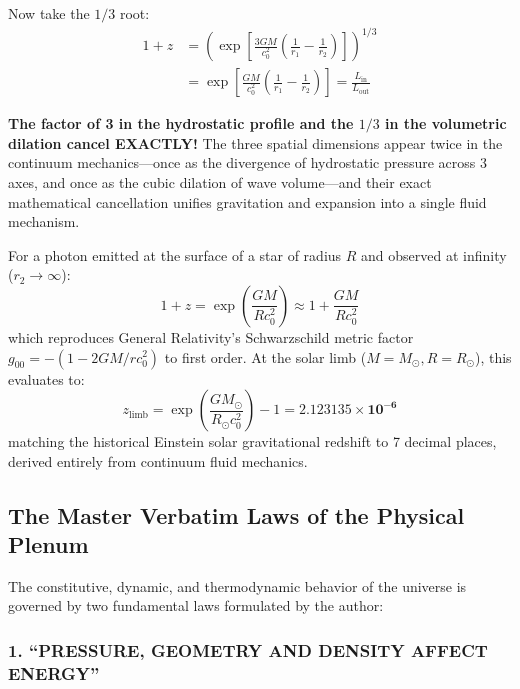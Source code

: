 \documentclass[11pt,a4paper]{article}
\begin{document}
Now take the $1/3$ root:
\begin{equation}
\begin{aligned} 1 + z &= \left( \exp\left[ \frac{3GM}{c_0^2} \left( \frac{1}{r_1} - \frac{1}{r_2} \right) \right] \right)^{1/3} \\ &= \exp\left[ \frac{GM}{c_0^2} \left( \frac{1}{r_1} - \frac{1}{r_2} \right) \right] = \frac{L_{\text{in}}}{L_{\text{out}}} \end{aligned}
\label{eq:exact_dimensional_cancellation}
\end{equation}

\textbf{The factor of 3 in the hydrostatic profile and the $1/3$ in the volumetric dilation cancel EXACTLY!}
The three spatial dimensions appear twice in the continuum mechanics---once as the divergence of hydrostatic pressure across 3 axes, and once as the cubic dilation of wave volume---and their exact mathematical cancellation unifies gravitation and expansion into a single fluid mechanism.

For a photon emitted at the surface of a star of radius $R$ and observed at infinity ($r_2 \to \infty$):
\begin{equation}
1 + z = \exp\left( \frac{GM}{R c_0^2} \right) \approx 1 + \frac{GM}{R c_0^2}
\end{equation}
which reproduces General Relativity's Schwarzschild metric factor $g_{00} = -(1 - 2GM/rc_0^2)$ to first order. At the solar limb ($M = M_\odot, R = R_\odot$), this evaluates to:
\begin{equation}
z_{\text{limb}} = \exp\left( \frac{G M_\odot}{R_\odot c_0^2} \right) - 1 = \mathbf{2.123135 \times 10^{-6}}
\end{equation}
matching the historical Einstein solar gravitational redshift to 7 decimal places, derived entirely from continuum fluid mechanics.

\subsection{The Master Verbatim Laws of the Physical Plenum}
\label{subsec:master_verbatim_laws}

The constitutive, dynamic, and thermodynamic behavior of the universe is governed by two fundamental laws formulated by the author:

\subsubsection{1. ``PRESSURE, GEOMETRY AND DENSITY AFFECT ENERGY''}
\end{document}
